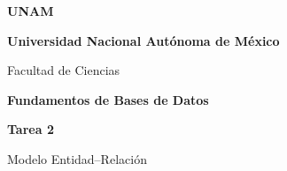 \begin{titlepage}
  \thispagestyle{empty}
  \pagecolor{white}
  \begin{center}
    \vspace*{0.7cm}

    \begin{tcolorbox}[
      colback=white,
      colframe=unamblue,
      width=0.82\textwidth,
      arc=5mm,
      boxrule=1pt
    ]
      \centering
      \vspace{0.25cm}
      {\fontsize{24}{28}\selectfont\textcolor{unamblue}{\textbf{UNAM}}\par}
      \vspace{0.15cm}
    \end{tcolorbox}

    \vspace{0.9cm}
    {\fontsize{22}{26}\selectfont\textcolor{unamblue}{\textbf{Universidad Nacional Autónoma de México}}\par}
    \vspace{0.45cm}
    {\fontsize{17}{21}\selectfont\textcolor{unamblue}{Facultad de Ciencias}\par}

    \vspace{1.25cm}

    \begin{tcolorbox}[
      colback=lightgray,
      colframe=unamblue,
      width=0.92\textwidth,
      arc=0mm,
      boxrule=2pt
    ]
      \centering
      \vspace{0.3cm}
      {\fontsize{18}{22}\selectfont\textbf{Fundamentos de Bases de Datos}\par}
      \vspace{0.55cm}
      {\fontsize{27}{31}\selectfont\textcolor{unamblue}{\textbf{Tarea 2}}\par}
      \vspace{0.25cm}
      {\fontsize{18}{22}\selectfont Modelo Entidad--Relación\par}
      \vspace{0.3cm}
    \end{tcolorbox}

    \vspace{0.8cm}


\end{center}
\end{titlepage}
